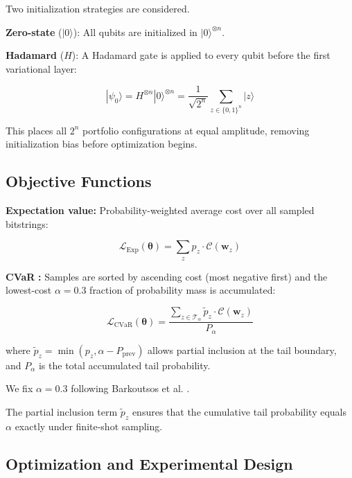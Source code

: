\documentclass[runningheads]{llncs}
\begin{document}
Two initialization strategies are considered.

\textbf{Zero-state} ($|0\rangle$): All qubits are initialized in $|0\rangle^{\otimes n}$.

\textbf{Hadamard} ($H$): A Hadamard gate \cite{nielsen2010} is applied to every qubit before the first variational layer:

\begin{equation}
    |\psi_0\rangle = H^{\otimes n}|0\rangle^{\otimes n} 
    = \frac{1}{\sqrt{2^n}} \sum_{z \in \{0,1\}^n} |z\rangle
\end{equation}

This places all $2^n$ portfolio configurations at equal amplitude, removing initialization bias before optimization begins.

\subsection{Objective Functions}

\textbf{Expectation value: } Probability-weighted average cost over all sampled bitstrings:

\begin{equation}
    \mathcal{L}_{\text{Exp}}(\boldsymbol{\theta}) = 
    \sum_{z} p_z \cdot \mathcal{C}(\mathbf{w}_z)
\end{equation}

\textbf{CVaR} \cite{barkoutsos2020}\textbf{:} Samples are sorted by ascending cost (most negative first) and the lowest-cost $\alpha = 0.3$ fraction of probability mass is accumulated:

\begin{equation}
    \mathcal{L}_{\text{CVaR}}(\boldsymbol{\theta}) = 
    \frac{\displaystyle\sum_{z \in \mathcal{T}_\alpha} 
    \tilde{p}_z \cdot \mathcal{C}(\mathbf{w}_z)}{P_\alpha}
\end{equation}

where $\tilde{p}_z = \min(p_z, \alpha - P_{\text{prev}})$ allows partial inclusion at the tail boundary, and $P_\alpha$ is the total accumulated tail probability.

We fix $\alpha=0.3$ following Barkoutsos et al. \cite{barkoutsos2020}.

The partial inclusion term \(\tilde{p}_z\) ensures that the cumulative tail probability equals \(\alpha\) exactly under finite-shot sampling.

\subsection{Optimization and Experimental Design}
\end{document}
